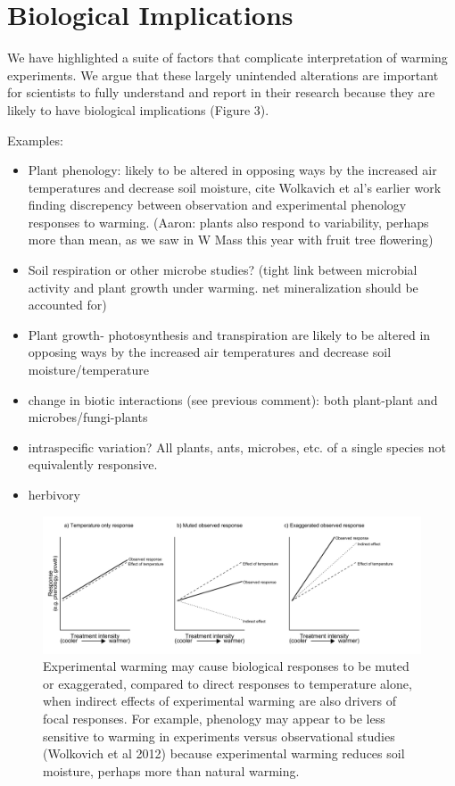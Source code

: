 \documentclass{article}
\begin{document}
\section {Biological Implications}
\par We have highlighted a suite of factors that complicate   interpretation of warming experiments. We argue that these largely unintended alterations are important for scientists to fully understand and report in their research because they are likely to have biological implications (Figure 3).
\par Examples:
\begin{itemize}
\item Plant phenology: likely to be altered in opposing ways by
the increased air temperatures and decrease soil moisture, cite Wolkavich et al's earlier work finding discrepency between observation and experimental phenology responses to warming. (Aaron: plants also respond to variability, perhaps more than mean, as we saw in W Mass this year with fruit tree flowering)
\item Soil respiration or other microbe studies? (tight link between microbial activity and plant growth under warming. net mineralization should be accounted for)
\item Plant growth- photosynthesis and transpiration are likely to be altered in opposing ways by the increased air temperatures and decrease soil moisture/temperature %
\item change in biotic interactions (see previous comment): both plant-plant and microbes/fungi-plants
\item intraspecific variation? All plants, ants, microbes, etc. of a single species not equivalently responsive. 
\item herbivory
\end{itemize}
 \begin{figure}[p]
     \centering
 \includegraphics{figures/DirIndWarmingEffects.pdf}    
 \caption{Experimental warming may cause biological responses to be muted or exaggerated, compared to direct responses to temperature alone, when indirect effects of experimental warming are also drivers of focal responses. For example, phenology may appear to be less sensitive to warming in experiments versus observational studies (Wolkovich et al 2012) because experimental warming reduces soil moisture, perhaps more than natural warming.}
 \end{figure}
\end{document}
